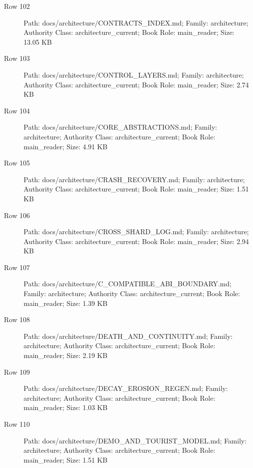 \documentclass[9pt,a4paper]{book}
\begin{document}
\begin{description}
\item[Row 102] Path: docs/\allowbreak{}architecture/\allowbreak{}CONTRACTS\_\allowbreak{}INDEX.\allowbreak{}md; Family: architecture; Authority Class: architecture\_\allowbreak{}current; Book Role: main\_\allowbreak{}reader; Size: 13.\allowbreak{}05 KB
\item[Row 103] Path: docs/\allowbreak{}architecture/\allowbreak{}CONTROL\_\allowbreak{}LAYERS.\allowbreak{}md; Family: architecture; Authority Class: architecture\_\allowbreak{}current; Book Role: main\_\allowbreak{}reader; Size: 2.\allowbreak{}74 KB
\item[Row 104] Path: docs/\allowbreak{}architecture/\allowbreak{}CORE\_\allowbreak{}ABSTRACTIONS.\allowbreak{}md; Family: architecture; Authority Class: architecture\_\allowbreak{}current; Book Role: main\_\allowbreak{}reader; Size: 4.\allowbreak{}91 KB
\item[Row 105] Path: docs/\allowbreak{}architecture/\allowbreak{}CRASH\_\allowbreak{}RECOVERY.\allowbreak{}md; Family: architecture; Authority Class: architecture\_\allowbreak{}current; Book Role: main\_\allowbreak{}reader; Size: 1.\allowbreak{}51 KB
\item[Row 106] Path: docs/\allowbreak{}architecture/\allowbreak{}CROSS\_\allowbreak{}SHARD\_\allowbreak{}LOG.\allowbreak{}md; Family: architecture; Authority Class: architecture\_\allowbreak{}current; Book Role: main\_\allowbreak{}reader; Size: 2.\allowbreak{}94 KB
\item[Row 107] Path: docs/\allowbreak{}architecture/\allowbreak{}C\_\allowbreak{}COMPATIBLE\_\allowbreak{}ABI\_\allowbreak{}BOUNDARY.\allowbreak{}md; Family: architecture; Authority Class: architecture\_\allowbreak{}current; Book Role: main\_\allowbreak{}reader; Size: 1.\allowbreak{}39 KB
\item[Row 108] Path: docs/\allowbreak{}architecture/\allowbreak{}DEATH\_\allowbreak{}AND\_\allowbreak{}CONTINUITY.\allowbreak{}md; Family: architecture; Authority Class: architecture\_\allowbreak{}current; Book Role: main\_\allowbreak{}reader; Size: 2.\allowbreak{}19 KB
\item[Row 109] Path: docs/\allowbreak{}architecture/\allowbreak{}DECAY\_\allowbreak{}EROSION\_\allowbreak{}REGEN.\allowbreak{}md; Family: architecture; Authority Class: architecture\_\allowbreak{}current; Book Role: main\_\allowbreak{}reader; Size: 1.\allowbreak{}03 KB
\item[Row 110] Path: docs/\allowbreak{}architecture/\allowbreak{}DEMO\_\allowbreak{}AND\_\allowbreak{}TOURIST\_\allowbreak{}MODEL.\allowbreak{}md; Family: architecture; Authority Class: architecture\_\allowbreak{}current; Book Role: main\_\allowbreak{}reader; Size: 1.\allowbreak{}51 KB

\end{description}
\end{document}
